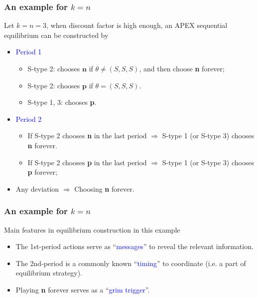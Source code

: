 \documentclass[9pt]{beamer}
\begin{document}
\begin{frame}
  \frametitle{An example for $k=n$}
\begin{center}
\end{center}

  
Let \alert{$k=n=3$}, when discount factor is high enough, an APEX sequential equilibrium can be constructed by
\begin{itemize}

\item \textcolor{blue}{Period 1}
\begin{itemize}
\item S-type 2: chooses $\textbf{n}$ if $\theta\neq (S,S,S)$, and then choose \alert{\textbf{n} forever};
\item S-type 2: chooses $\textbf{p}$ if $\theta=(S,S,S)$.
\item S-type 1, 3: chooses \textbf{p}.
\end{itemize}

\item \textcolor{blue}{Period 2}
\begin{itemize}
\item If S-type 2 chooses \textbf{n} in the last period $\Rightarrow$ S-type 1 (or S-type 3) chooses \alert{\textbf{n} forever}.
\item If S-type 2 chooses \textbf{p} in the last period $\Rightarrow$ S-type 1 (or S-type 3) chooses \textbf{p} forever; 
\end{itemize}
 
 \item Any deviation $\Rightarrow$ Choosing \alert<1->{\textbf{n} forever}.
\end{itemize}

\end{frame}


\begin{frame}
  \frametitle{An example for $k=n$}
Main features in equilibrium construction in this example
\begin{itemize}
\item The \alert{1st-period} actions serve as ``\textcolor{blue}{messages}'' to reveal the relevant information.
\item The \alert{2nd-period} is a commonly known ``\textcolor{blue}{timing}'' to coordinate (i.e. a part of equilibrium strategy).
\item \alert{Playing \textbf{n} forever} serves as a ``\textcolor{blue}{grim trigger}''.
\end{itemize}  
\end{frame}
\end{document}
